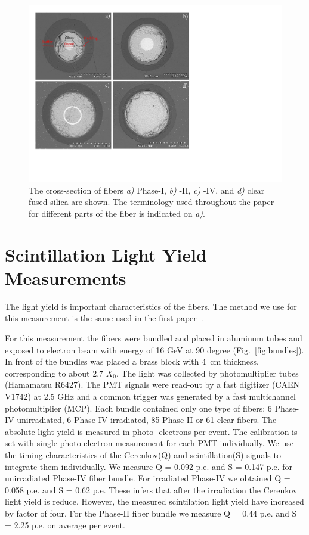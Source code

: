 \documentclass[a4paper,11pt]{article}
\begin{document}
\begin{figure}[ht]
\begin{center}\vspace{-1pc}
      \includegraphics[width=10 cm]{Figures/allfiberimage2.pdf}
\caption{\small The cross-section of fibers
{\it a)} Phase-I,
{\it b)} -II,
{\it c)} -IV, and
{\it d)} clear fused-silica are shown.  The terminology used throughout the paper for different parts of the fiber is indicated on {\it a)}.}
    \label{fig:FiberCrossSections}
\end{center}
\end{figure}

\section{Scintillation Light Yield Measurements}
\label{sec:lightyield}
The light yield is important characteristics of the fibers. The method we use for this measurement is the same used in the first paper~\cite{JINSTPaper}. 

For this measurement the fibers were bundled and placed in aluminum tubes and exposed to electron beam with energy of 16 GeV at 90 degree (Fig.~\ref{fig:bundles}). In front of the bundles was placed a brass block with 4~cm thickness, corresponding to about 2.7 $X_0$. The light was collected by photomultiplier tubes (Hamamatsu R6427). The PMT signals were read-out by a fast digitizer (CAEN V1742) at 2.5 GHz and a common trigger was generated by a fast multichannel photomultiplier (MCP). Each bundle contained only one type of fibers: 6 Phase-IV unirradiated, 6 Phase-IV irradiated, 85 Phase-II or 61 clear fibers. The absolute light yield is measured in photo- electrons per event. The calibration is set with single photo-electron measurement for each PMT individually. We use the timing characteristics of the Cerenkov(Q) and scintillation(S) signals to integrate them individually. We measure Q = 0.092 p.e. and S = 0.147 p.e. for unirradiated Phase-IV fiber bundle. For irradiated Phase-IV we obtained Q = 0.058 p.e. and S = 0.62 p.e. 
These infers that after the irradiation the Cerenkov light yield is reduce. However, the measured scintilation light yield have increased by factor of four. For the Phase-II fiber bundle we measure Q = 0.44 p.e. and S = 2.25 p.e. on average per event.
\end{document}
